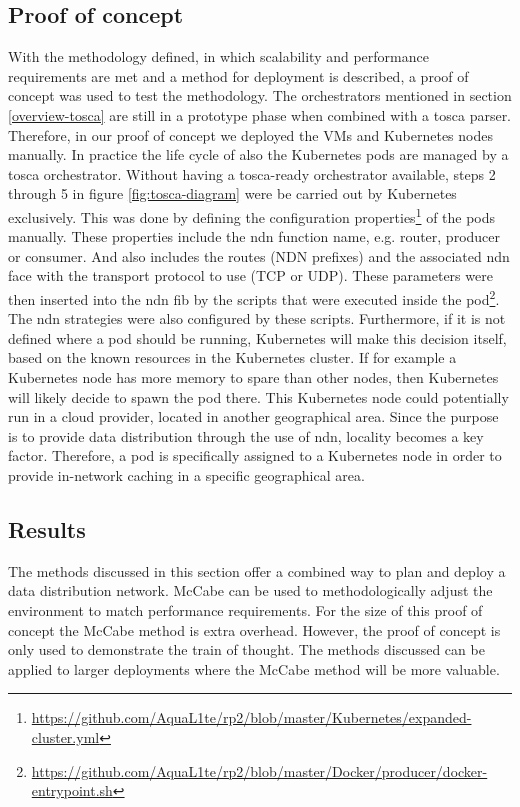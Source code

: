 \subsection{Proof of concept}
\label{planning-poc}
With the methodology defined, in which scalability and performance requirements are met and a method for deployment is described, a proof of concept was used to test the methodology. The orchestrators mentioned in section \ref{overview-tosca} are still in a prototype phase when combined with a \gls{tosca} parser. Therefore, in our proof of concept we deployed the VMs and Kubernetes nodes manually. In practice the life cycle of also the Kubernetes pods are managed by a \gls{tosca} orchestrator. Without having a \gls{tosca}-ready orchestrator available, steps 2 through 5 in figure \ref{fig:tosca-diagram} were be carried out by Kubernetes exclusively. This was done by defining the configuration properties\footnote{\url{https://github.com/AquaL1te/rp2/blob/master/Kubernetes/expanded-cluster.yml}} of the pods manually. These properties include the \gls{ndn} function name, e.g. router, producer or consumer. And also includes the routes (NDN prefixes) and the associated \gls{ndn} face with the transport protocol to use (TCP or UDP). These parameters were then inserted into the \gls{ndn} \gls{fib} by the scripts that were executed inside the pod\footnote{\url{https://github.com/AquaL1te/rp2/blob/master/Docker/producer/docker-entrypoint.sh}}. The \gls{ndn} strategies were also configured by these scripts. Furthermore, if it is not defined where a pod should be running, Kubernetes will make this decision itself, based on the known resources in the Kubernetes cluster. If for example a Kubernetes node has more memory to spare than other nodes, then Kubernetes will likely decide to spawn the pod there. This Kubernetes node could potentially run in a cloud provider, located in another geographical area. Since the purpose is to provide data distribution through the use of \gls{ndn}, locality becomes a key factor. Therefore, a pod is specifically assigned to a Kubernetes node in order to provide in-network caching in a specific geographical area.

\subsection{Results}
The methods discussed in this section offer a combined way to plan and deploy a data distribution network. McCabe can be used to methodologically adjust the environment to match performance requirements. For the size of this proof of concept the McCabe method is extra overhead. However, the proof of concept is only used to demonstrate the train of thought. The methods discussed can be applied to larger deployments where the McCabe method will be more valuable.

